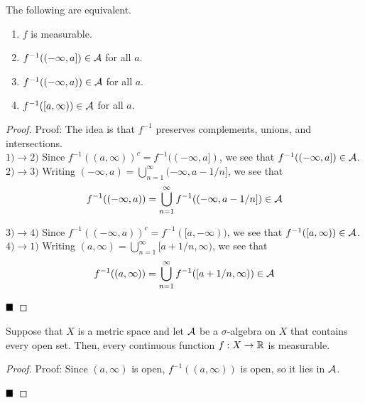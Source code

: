 
\begin{lemma}
    The following are equivalent.
    \begin{enumerate}
        \item $f$ is measurable.
        \item $f^{-1}((-\infty, a]) \in \cal{A}$ for all $a$.
        \item $f^{-1}((-\infty, a)) \in \cal{A}$ for all $a$.
        \item $f^{-1}([a, \infty)) \in \cal{A}$ for all $a$. 
    \end{enumerate}
\end{lemma}
\begin{proof}{Proof:}
    The idea is that $f^{-1}$ preserves complements, unions, and intersections.\\

    $1) \to 2)$ Since $f^{-1}((a, \infty))^{c} = f^{-1}((-\infty, a])$, we see that $f^{-1}((-\infty, a]) \in \cal{A}$.\\

    $2) \to 3)$ Writing $(-\infty, a) = \bigcup_{n = 1}^{\infty} (-\infty, a - 1/n]$, we see that
    \[ f^{-1}((-\infty, a)) = \bigcup_{n = 1}^{\infty} f^{-1}((-\infty, a - 1/n]) \in \cal{A} \]

    $3) \to 4)$ Since $f^{-1}((-\infty, a))^{c} = f^{-1}([a, -\infty))$, we see that $f^{-1}([a, \infty)) \in \cal{A}$.\\

    $4) \to 1)$ Writing $(a, \infty) = \bigcup_{n = 1}^{\infty} [a + 1/n, \infty)$, we see that
    \[ f^{-1}((a, \infty)) = \bigcup_{n = 1}^{\infty} f^{-1}([a + 1/n, \infty)) \in \cal{A} \]

    $\qed$
\end{proof}

\begin{lemma}
    Suppose that $X$ is a metric space and let $\cal{A}$ be a $\sigma$-algebra on $X$ that contains every open set. Then, every continuous function $f : X \to \R$ is measurable.
\end{lemma}
\begin{proof}{Proof:}
    Since $(a, \infty)$ is open, $f^{-1}((a, \infty))$ is open, so it lies in $\cal{A}$. 

    $\qed$
\end{proof}

